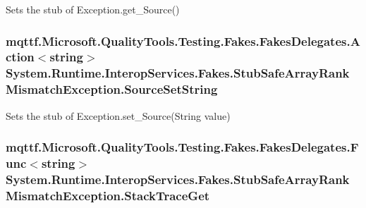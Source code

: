 Sets the stub of Exception.\-get\-\_\-\-Source()

\hypertarget{class_system_1_1_runtime_1_1_interop_services_1_1_fakes_1_1_stub_safe_array_rank_mismatch_exception_a5b3d1e155372ef17b568316751051556}{
\subsubsection[{Source\-Set\-String}]{\setlength{\rightskip}{0pt plus 5cm}mqttf.\-Microsoft.\-Quality\-Tools.\-Testing.\-Fakes.\-Fakes\-Delegates.\-Action$<$string$>$ System.\-Runtime.\-Interop\-Services.\-Fakes.\-Stub\-Safe\-Array\-Rank\-Mismatch\-Exception.\-Source\-Set\-String}}\label{class_system_1_1_runtime_1_1_interop_services_1_1_fakes_1_1_stub_safe_array_rank_mismatch_exception_a5b3d1e155372ef17b568316751051556}


Sets the stub of Exception.\-set\-\_\-\-Source(\-String value)

\hypertarget{class_system_1_1_runtime_1_1_interop_services_1_1_fakes_1_1_stub_safe_array_rank_mismatch_exception_abc796faa35b2045e10b244d926d061ee}{
\subsubsection[{Stack\-Trace\-Get}]{\setlength{\rightskip}{0pt plus 5cm}mqttf.\-Microsoft.\-Quality\-Tools.\-Testing.\-Fakes.\-Fakes\-Delegates.\-Func$<$string$>$ System.\-Runtime.\-Interop\-Services.\-Fakes.\-Stub\-Safe\-Array\-Rank\-Mismatch\-Exception.\-Stack\-Trace\-Get}}\label{class_system_1_1_runtime_1_1_interop_services_1_1_fakes_1_1_stub_safe_array_rank_mismatch_exception_abc796faa35b2045e10b244d926d061ee}


